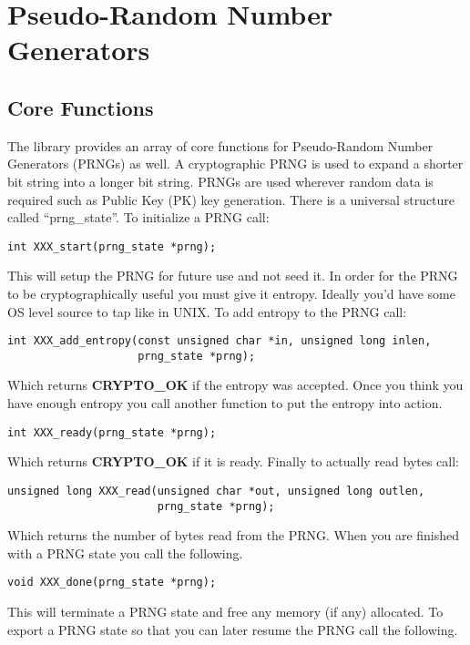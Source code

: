 \documentclass[a4paper]{book}
\begin{document}
\chapter{Pseudo-Random Number Generators}
\section{Core Functions}
The library provides an array of core functions for Pseudo-Random Number Generators (PRNGs) as well.  A cryptographic PRNG is
used to expand a shorter bit string into a longer bit string.  PRNGs are used wherever random data is required such as Public Key (PK)
key generation.  There is a universal structure called ``prng\_state''.  To initialize a PRNG call:
\begin{verbatim}
int XXX_start(prng_state *prng);
\end{verbatim}

This will setup the PRNG for future use and not seed it.  In order for the PRNG to be cryptographically useful you must give it 
entropy.  Ideally you'd have some OS level source to tap like in UNIX.  To add entropy to the PRNG call:
\begin{verbatim}
int XXX_add_entropy(const unsigned char *in, unsigned long inlen, 
                    prng_state *prng);
\end{verbatim}

Which returns {\bf CRYPTO\_OK} if the entropy was accepted.  Once you think you have enough entropy you call another
function to put the entropy into action.
\begin{verbatim}
int XXX_ready(prng_state *prng);
\end{verbatim}

Which returns {\bf CRYPTO\_OK} if it is ready.  Finally to actually read bytes call:
\begin{verbatim}
unsigned long XXX_read(unsigned char *out, unsigned long outlen,
                       prng_state *prng);
\end{verbatim}

Which returns the number of bytes read from the PRNG.  When you are finished with a PRNG state you call
the following.

\begin{verbatim}
void XXX_done(prng_state *prng);
\end{verbatim}

This will terminate a PRNG state and free any memory (if any) allocated.  To export a PRNG state
so that you can later resume the PRNG call the following.
\end{document}
